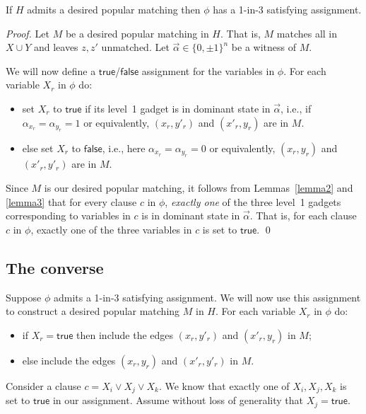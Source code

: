 \documentclass{llncs}
\begin{document}
\begin{lemma}
  \label{thm1}
If $H$ admits a desired popular matching then $\phi$ has a 1-in-3 satisfying assignment.
\end{lemma}
\begin{proof}
  Let $M$ be a desired popular matching in $H$. That is, $M$ matches all in $X \cup Y$ and leaves $z,z'$ unmatched. Let $\vec{\alpha} \in \{0,\pm 1\}^n$
  be a witness of $M$.
  
  We will now define a $\mathsf{true}$/$\mathsf{false}$ assignment for the variables in $\phi$.
  For each variable $X_r$ in $\phi$ do:
  \begin{itemize}
    \item set $X_r$ to $\mathsf{true}$ if its level~1 gadget is in dominant state in $\vec{\alpha}$, i.e.,
      if $\alpha_{x_r} = \alpha_{y_r} = 1$ or equivalently, $(x_r,y'_r)$ and $(x'_r,y_r)$ are in $M$.
    \item else  set  $X_r$ to $\mathsf{false}$, i.e., here $\alpha_{x_r} = \alpha_{y_r} = 0$ or equivalently, $(x_r,y_r)$ and $(x'_r,y'_r)$ are in $M$.
  \end{itemize}
      
  Since $M$ is our desired popular matching, 
  it follows from Lemmas~\ref{lemma2} and \ref{lemma3} that for every clause $c$ in $\phi$, {\em exactly one} of the three level~1 gadgets
  corresponding to variables in $c$ is in dominant state in $\vec{\alpha}$. That is, for each clause $c$ in $\phi$, exactly one of the three
  variables in $c$ is set to $\mathsf{true}$. \qed %
\end{proof}

\subsection{The converse}

Suppose $\phi$ admits a 1-in-3 satisfying assignment. We will now use this assignment to construct a desired popular matching $M$ in $H$.
For each variable $X_r$ in $\phi$ do:
\begin{itemize}
\item if $X_r = \mathsf{true}$ then include the edges $(x_r,y'_r)$ and $(x'_r,y_r)$ in $M$;
\item else include the edges $(x_r,y_r)$ and $(x'_r,y'_r)$ in $M$.
\end{itemize}
  
Consider a clause $c = X_i \vee X_j \vee X_k$. We know that exactly one of $X_i,X_j,X_k$ is set to $\mathsf{true}$ in our assignment.
Assume without loss of generality that $X_j = \mathsf{true}$. 
\end{document}
